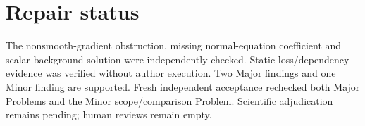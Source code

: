 \documentclass[10pt]{article}
\begin{document}
\section*{Repair status}
The nonsmooth-gradient obstruction, missing normal-equation coefficient and scalar background solution were independently checked. Static loss/dependency evidence was verified without author execution. Two Major findings and one Minor finding are supported. Fresh independent acceptance rechecked both Major Problems and the Minor scope/comparison Problem. Scientific adjudication remains pending; human reviews remain empty.\par
\end{document}
